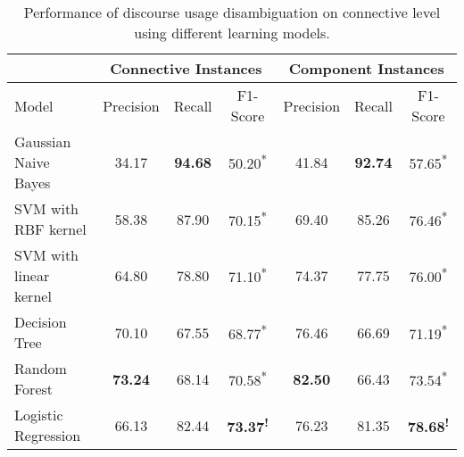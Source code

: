 \begin{table}[!htbp]
\centering
\begin{tabular}{|l|c|c|c|c|c|c|}
\hline
                        & \multicolumn{3}{c|}{Connective Instances}                 & \multicolumn{3}{c|}{Component Instances}                  \\ \hline
Model                   &     Precision &     Recall &     F1-Score                 &     Precision &     Recall &     F1-Score                 \\ \hline
Gaussian Naive Bayes    &     34.17     & \bf 94.68  &     50.20\textsuperscript{*} &     41.84     & \bf 92.74  &     57.65\textsuperscript{*} \\ \hline
SVM with RBF kernel     &     58.38     &     87.90  &     70.15\textsuperscript{*} &     69.40     &     85.26  &     76.46\textsuperscript{*} \\ \hline
SVM with linear kernel  &     64.80     &     78.80  &     71.10\textsuperscript{*} &     74.37     &     77.75  &     76.00\textsuperscript{*} \\ \hline
Decision Tree           &     70.10     &     67.55  &     68.77\textsuperscript{*} &     76.46     &     66.69  &     71.19\textsuperscript{*} \\ \hline
Random Forest           & \bf 73.24     &     68.14  &     70.58\textsuperscript{*} & \bf 82.50     &     66.43  &     73.54\textsuperscript{*} \\ \hline
Logistic Regression     &     66.13     &     82.44  & \bf 73.37\textsuperscript{!} &     76.23     &     81.35  & \bf 78.68\textsuperscript{!} \\ \hline

\end{tabular}
\caption{\label{t:recognition-connective-models} Performance of discourse usage
disambiguation on connective level using different learning models. }
\end{table}

